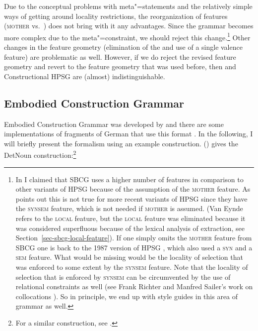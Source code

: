 Due to the conceptual problems with meta"=statements and the relatively simple ways of getting
around locality restrictions, the reorganization of features (\textsc{mother} vs.\ \synsem) does not bring with it any advantages. Since the grammar becomes more complex due to the meta"=constraint, we should
reject this change.\footnote{
  In  I claimed that SBCG uses a higher number of features in comparison
  to other variants of HPSG because of the assumption of the \textsc{mother} feature. As \citet{VanEynde2015a} points out this is not true for more recent variants of HPSG since
 they have the \textsc{synsem} feature, which is not needed if \textsc{mother} is assumed. (Van Eynde refers to the \textsc{local}
 feature, but the \textsc{local} feature was eliminated because it was considered superfluous
 because of the lexical analysis of extraction, see Section~\ref{sec-sbcg-local-feature}).
 If one simply omits the \textsc{mother} feature from SBCG one is back to
 the 1987 version of HPSG \citep{ps}, which also used a \textsc{syn} and a \textsc{sem} feature. What would be
 missing would be the locality of selection \citep[]{Sag2012a} that was enforced to some extent by the \textsc{synsem}
 feature. Note that the locality of selection that is enforced by \textsc{synsem} can be
 circumvented by the use of relational constraints as well (see Frank Richter and Manfred Sailer's work on
 collocations \citep{RS99b-u,SS2003a}). So in principle, we end up with style guides in this
 area of grammar as well.%
} 
Other changes in the feature geometry (elimination of the \localf and use of a single valence
feature) are problematic as well. However, if we do reject the revised feature geometry and revert
to the feature geometry that was used before, then \sbcg and Constructional HPSG \citep{Sag97a} are (almost) indistinguishable.

\subsection{Embodied Construction Grammar}
\label{sec-ECG}

Embodied Construction Grammar was developed by \citet{BC2005a}  and there are some implementations of fragments of German that use this
format \citep{PMAZ2006a-u}. In the following, I will briefly present the formalism using an example construction.
() gives the DetNoun construction:\footnote{
  For a similar construction, see .
}

